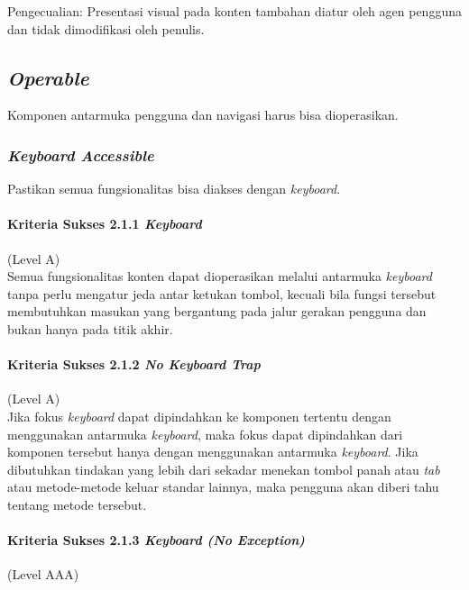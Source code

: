 Pengecualian: Presentasi visual pada konten tambahan diatur oleh agen pengguna dan tidak dimodifikasi oleh penulis.



\subsection{\textit{Operable}}
\label{sec:operable}
Komponen antarmuka pengguna dan navigasi harus bisa dioperasikan.

\subsubsection{\textit{Keyboard Accessible}}
\label{sec:keyboard_accessible}
Pastikan semua fungsionalitas bisa diakses dengan \textit{keyboard}.

\paragraph{Kriteria Sukses 2.1.1 \textit{Keyboard}}
\label{sec:kriteria_sukses_2.1.1}
(Level A)\\

Semua fungsionalitas konten dapat dioperasikan melalui antarmuka \textit{keyboard} tanpa perlu mengatur jeda antar ketukan tombol, kecuali bila fungsi tersebut membutuhkan masukan yang bergantung pada jalur gerakan pengguna dan bukan hanya pada titik akhir.

\paragraph{Kriteria Sukses 2.1.2 \textit{No Keyboard Trap}}
\label{sec:kriteria_sukses_2.1.2}
(Level A)\\

Jika fokus \textit{keyboard} dapat dipindahkan ke komponen tertentu dengan menggunakan antarmuka \textit{keyboard}, maka fokus dapat dipindahkan dari komponen tersebut hanya dengan menggunakan antarmuka \textit{keyboard}. Jika dibutuhkan tindakan yang lebih dari sekadar menekan tombol panah atau \textit{tab} atau metode-metode keluar standar lainnya, maka pengguna akan diberi tahu tentang metode tersebut.

\paragraph{Kriteria Sukses 2.1.3 \textit{Keyboard (No Exception)}}
\label{sec:kriteria_sukses_2.1.3}
(Level AAA)\\

